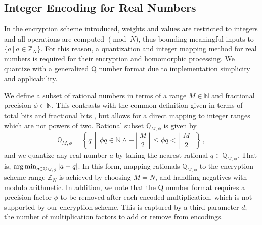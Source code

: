 \documentclass[10pt,letterpaper,oneside,twocolumn,journal]{IEEEtran}
\theoremstyle{definition}
\theoremstyle{definition}
\theoremstyle{remark}
\begin{document}
\subsection{Integer Encoding for Real Numbers} \label{subsec:encoding}



In the encryption scheme introduced, weights and values are restricted to integers and all operations are computed $\pmod{N}$, thus bounding meaningful inputs to $\{a \,|\, a \in \mathbb{Z}_N\}$. For this reason, a quantization and integer mapping method for real numbers is required for their encryption and homomorphic processing. We quantize with a generalized Q number format \cite{oberstarFixedPointRepresentationFractional2007} due to implementation simplicity and applicability.

We define a subset of rational numbers in terms of a range $M \in \mathbb{N}$ and fractional precision $\phi \in \mathbb{N}$. This contrasts with the common definition given in terms of total bits and fractional bits \cite{oberstarFixedPointRepresentationFractional2007,schulzedarupEncryptedCooperativeControl2019,farokhiSecurePrivateControl2017}, but allows for a direct mapping to integer ranges which are not powers of two. Rational subset $\mathbb{Q}_{M,\phi}$ is given by
\begin{equation}
    \mathbb{Q}_{M,\phi} = \left\{q \,\middle|\, \phi q \in \mathbb{N} \wedge -\left\lfloor\frac{M}{2}\right\rfloor \leq \phi q < \left\lfloor\frac{M}{2}\right\rfloor \right\}\,,
\end{equation}
and we quantize any real number $a$ by taking the nearest rational $q \in \mathbb{Q}_{M,\phi}$. That is, $\operatorname*{arg\,min}_{q\in\mathbb{Q}_{M,\phi}} |a-q|$. In this form, mapping rationals $\mathbb{Q}_{M,\phi}$ to the encryption scheme range $\mathbb{Z}_N$ is achieved by choosing $M=N$, and handling negatives with modulo arithmetic. In addition, we note that the Q number format requires a precision factor $\phi$ to be removed after each encoded multiplication, which is not supported by our encryption scheme. This is captured by a third parameter $d$; the number of multiplication factors to add or remove from encodings.
\end{document}
